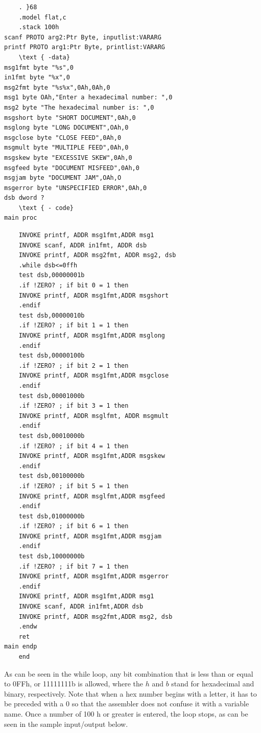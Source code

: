 \documentclass[10pt]{article}
\begin{document}
\begin{verbatim}
    . }68
    .model flat,c
    .stack 100h
scanf PROTO arg2:Ptr Byte, inputlist:VARARG
printf PROTO arg1:Ptr Byte, printlist:VARARG
    \text { -data}
msg1fmt byte "%s",0
in1fmt byte "%x",0
msg2fmt byte "%s%x",0Ah,0Ah,0
msg1 byte OAh,"Enter a hexadecimal number: ",0
msg2 byte "The hexadecimal number is: ",0
msgshort byte "SHORT DOCUMENT",0Ah,0
msglong byte "LONG DOCUMENT",OAh,0
msgclose byte "CLOSE FEED",0Ah,0
msgmult byte "MULTIPLE FEED",0Ah,0
msgskew byte "EXCESSIVE SKEW",0Ah,0
msgfeed byte "DOCUMENT MISFEED",0Ah,0
msgjam byte "DOCUMENT JAM",OAh,O
msgerror byte "UNSPECIFIED ERROR",0Ah,0
dsb dword ?
    \text { - code}
main proc
\end{verbatim}

\begin{verbatim}
    INVOKE printf, ADDR msg1fmt,ADDR msg1
    INVOKE scanf, ADDR in1fmt, ADDR dsb
    INVOKE printf, ADDR msg2fmt, ADDR msg2, dsb
    .while dsb<=0ffh
    test dsb,00000001b
    .if !ZERO? ; if bit 0 = 1 then
    INVOKE printf, ADDR msg1fmt,ADDR msgshort
    .endif
    test dsb,00000010b
    .if !ZERO? ; if bit 1 = 1 then
    INVOKE printf, ADDR msg1fmt,ADDR msglong
    .endif
    test dsb,00000100b
    .if !ZERO? ; if bit 2 = 1 then
    INVOKE printf, ADDR msg1fmt,ADDR msgclose
    .endif
    test dsb,00001000b
    .if !ZERO? ; if bit 3 = 1 then
    INVOKE printf, ADDR msglfmt, ADDR msgmult
    .endif
    test dsb,00010000b
    .if !ZERO? ; if bit 4 = 1 then
    INVOKE printf, ADDR msg1fmt,ADDR msgskew
    .endif
    test dsb,00100000b
    .if !ZERO? ; if bit 5 = 1 then
    INVOKE printf, ADDR msglfmt,ADDR msgfeed
    .endif
    test dsb,01000000b
    .if !ZERO? ; if bit 6 = 1 then
    INVOKE printf, ADDR msg1fmt,ADDR msgjam
    .endif
    test dsb,10000000b
    .if !ZERO? ; if bit 7 = 1 then
    INVOKE printf, ADDR msg1fmt,ADDR msgerror
    .endif
    INVOKE printf, ADDR msg1fmt,ADDR msg1
    INVOKE scanf, ADDR in1fmt,ADDR dsb
    INVOKE printf, ADDR msg2fmt,ADDR msg2, dsb
    .endw
    ret
main endp
    end
\end{verbatim}

As can be seen in the while loop, any bit combination that is less than or equal to 0FFh, or 11111111b is allowed, where the $h$ and $b$ stand for hexadecimal and binary, respectively. Note that when a hex number begins with a letter, it has to be preceded with a 0 so that the assembler does not confuse it with a variable name. Once a number of 100 h or greater is entered, the loop stops, as can be seen in the sample input/output below.
\end{document}
